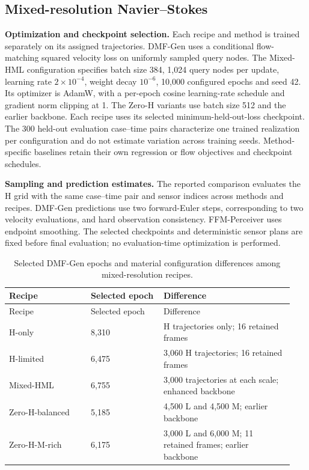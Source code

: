 \documentclass[11pt]{article}
\newcommand{\sisubsection}[1]{%
\FloatBarrier
\Needspace{5\baselineskip}%
\subsection{#1}%
}
\newcommand{\detail}[1]{\par\Needspace{4\baselineskip}\textbf{#1}\enspace}
\begin{document}
\sisubsection{Mixed-resolution Navier--Stokes}
\label{subsec:train-mixed}
\detail{Optimization and checkpoint selection.}
{
Each recipe and method is trained separately on its assigned trajectories. DMF-Gen uses a conditional flow-matching squared velocity loss on uniformly sampled query nodes. The Mixed-HML configuration specifies batch size 384, 1,024 query nodes per update, learning rate $2\times10^{-4}$, weight decay $10^{-6}$, 10,000 configured epochs and seed 42. Its optimizer is AdamW, with a per-epoch cosine learning-rate schedule and gradient norm clipping at 1. The Zero-H variants use batch size 512 and the earlier backbone. Each recipe uses its selected minimum-held-out-loss checkpoint. The 300 held-out evaluation case--time pairs characterize one trained realization per configuration and do not estimate variation across training seeds. Method-specific baselines retain their own regression or flow objectives and checkpoint schedules.
}
\detail{Sampling and prediction estimates.}
{
The reported comparison evaluates the H grid with the same case--time pair and sensor indices across methods and recipes. DMF-Gen predictions use two forward-Euler steps, corresponding to two velocity evaluations, and hard observation consistency. FFM-Perceiver uses endpoint smoothing. The selected checkpoints and deterministic sensor plans are fixed before final evaluation; no evaluation-time optimization is performed.
}
{\small
\begin{longtable}{@{}P{0.27\linewidth} P{0.24\linewidth} P{0.43\linewidth}@{}}
\caption{Selected DMF-Gen epochs and material configuration differences among mixed-resolution recipes.}\label{tab:mixed-runs}\\
\toprule Recipe & Selected epoch & Difference \\
\midrule\endfirsthead
\toprule Recipe & Selected epoch & Difference \\
\midrule\endhead
\bottomrule\endlastfoot
H-only & 8,310 & H trajectories only; 16 retained frames \\
H-limited & 6,475 & 3,060 H trajectories; 16 retained frames \\
Mixed-HML & 6,755 & 3,000 trajectories at each scale; enhanced backbone \\
Zero-H-balanced & 5,185 & 4,500 L and 4,500 M; earlier backbone \\
Zero-H-M-rich & 6,175 & 3,000 L and 6,000 M; 11 retained frames; earlier backbone \\
\end{longtable}
}
\end{document}
